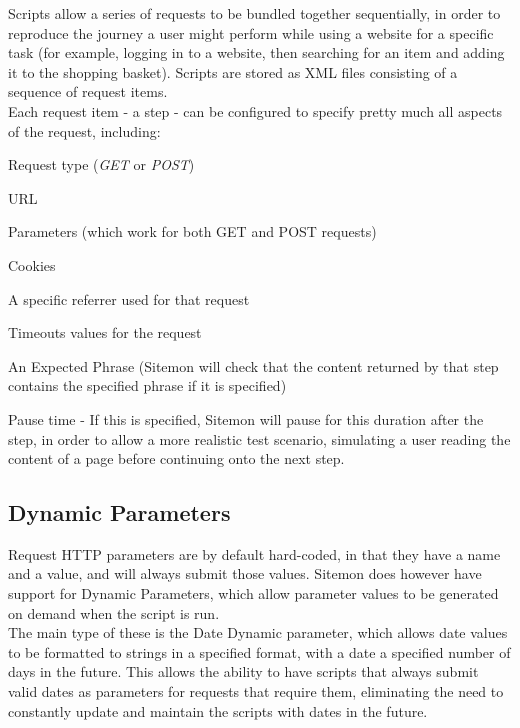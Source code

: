 \documentclass[a4paper]{article}
\newenvironment{small_list}{
\begin{itemize}
  \setlength{\itemsep}{0pt}
  \setlength{\parskip}{0pt}
  \setlength{\parsep}{0pt}
}
{\end{itemize}}
\begin{document}
Scripts allow a series of requests to be bundled together sequentially, in order to reproduce the journey a user might perform while
 using a website for a specific task (for example, logging in to a website, then searching for an item and adding it to the shopping
 basket). Scripts are stored as XML files consisting of a sequence of request items.\\
Each request item - a step - can be configured to specify pretty much all aspects of the request, including:
\begin{small_list}
	\item Request type ({\em GET} or {\em POST})
	\item URL
	\item Parameters (which work for both GET and POST requests)
	\item Cookies
	\item A specific referrer used for that request
	\item Timeouts values for the request
	\item An Expected Phrase (Sitemon will check that the content returned by that step contains the specified phrase if it is specified)
	\item Pause time - If this is specified, Sitemon will pause for this duration after the step, in order to allow a more realistic test
		scenario, simulating a user reading the content of a page before continuing onto the next step.
\end{small_list}

\subsection{Dynamic Parameters}

Request HTTP parameters are by default hard-coded, in that they have a name and a value, and will always submit those values. Sitemon does however have support for Dynamic Parameters, which allow parameter values to be generated on demand when the script is run.\\

The main type of these is the Date Dynamic parameter, which allows date values to be formatted to strings in a specified format, with a date a specified number of days in the future. This allows the ability to have scripts that always submit valid dates as parameters for requests that require them, eliminating the need to constantly update and maintain the scripts with dates in the future.\\
\end{document}
